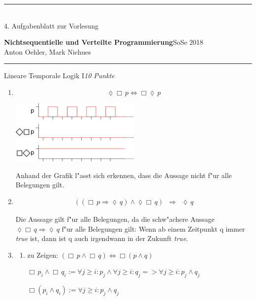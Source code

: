 \documentclass[a4paper,twoside,12pt]{article}
\newcommand{\ZETTELNUMMER}{4}
\newcounter{AUFGNR}
\newcommand{\AUFGABE}[2]{\vspace{0.3cm}\item[Aufgabe~\arabic{AUFGNR}]\stepcounter{AUFGNR} #1\hfill\emph{#2}}
\begin{document}
\pagestyle{empty}
\hrule\medskip
\rule{0ex}{0ex}\\[-1ex]
\ZETTELNUMMER. Aufgabenblatt zur Vorlesung

\smallskip
\noindent
\large
\textbf{Nichtsequentielle und Verteilte Programmierung}\hfill SoSe
2018 \\[0.5ex]
\normalsize
Anton Oehler, Mark Niehues

\newcommand{\immer}{\Box}
\newcommand{\irgendwann}{\lozenge}
\newcommand{\folgt}{\Rightarrow}
\newcommand{\oder}{\vee}
\newcommand{\und}{\wedge}

\medskip\hrule

\begin{description}
\AUFGABE{Lineare Temporale Logik I}{10 Punkte}
\begin{enumerate}
  \item { \[
     \lozenge \Box\, p \Leftrightarrow \Box \lozenge\, p
  \]}

  \includegraphics[width=0.5\textwidth]{1_a.png}

Anhand der Grafik l"asst sich erkennen, dass die Aussage nicht f"ur alle Belegungen gilt.

  \item \begin{eqnarray}
		     ((\Box\, p \Rightarrow \lozenge\, q) \land \lozenge \Box\, q )& \Rightarrow & \lozenge\, q
		\end{eqnarray}

Die Aussage gilt f"ur alle Belegungen, da die schw"achere Aussage $\lozenge \Box\, q \Rightarrow \lozenge\, q$ f"ur alle Belegungen gilt: Wenn ab einem Zeitpunkt q immer \textit{true} ist, dann ist q auch irgendwann in der Zukunft \textit{true}.

\item
\begin{enumerate}
\item zu Zeigen: $(\Box\, p \wedge \Box\, q) \Leftrightarrow \Box (p \wedge q)$

$
\Box\, p_i \wedge \Box\, q_i := \forall j \geq i : p_j \wedge \forall j \geq i:q_j => \forall j \geq i: p_j \wedge q_j
$

$
\Box (p_i \wedge q_i) := \forall j \geq i: p_j \wedge q_j
$


\end{enumerate}
\end{enumerate}
\end{description}
\end{document}
